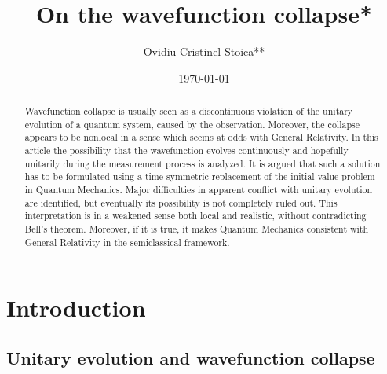 \documentclass[11pt]{amsart}
\title{On the wavefunction collapse*}
\author{Ovidiu Cristinel Stoica**}
\date{\today}
\theoremstyle{definition}
\theoremstyle{plain}
\begin{document}
\begin{abstract}
Wavefunction collapse is usually seen as a discontinuous violation of the unitary evolution of a quantum system, caused by the observation. Moreover, the collapse appears to be nonlocal in a sense which seems at odds with General Relativity. In this article the possibility that the wavefunction evolves continuously and hopefully unitarily during the measurement process is analyzed. It is argued that such a solution has to be formulated using a time symmetric replacement of the initial value problem in Quantum Mechanics. Major difficulties in apparent conflict with unitary evolution are identified, but eventually its possibility is not completely ruled out. This interpretation is in a weakened sense both local and realistic, without contradicting Bell's theorem. Moreover, if it is true, it makes Quantum Mechanics consistent with General Relativity in the semiclassical framework.
\end{abstract}

\maketitle

\section{Introduction}
\label{s:intro}

\subsection{Unitary evolution and wavefunction collapse}
\label{s:standardQM}
\end{document}
